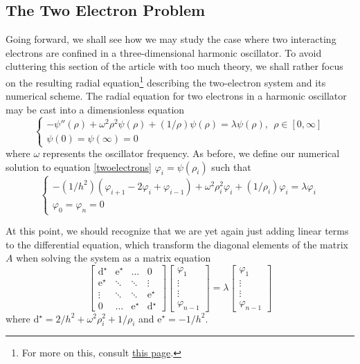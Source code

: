 	\subsection{The Two Electron Problem}
	Going forward, we shall see how we may study the case where two interacting electrons are confined in a three-dimensional harmonic oscillator. To avoid cluttering this section of the article with too much theory, we shall rather focus on the resulting radial equation\footnote{For more on this, consult \href{https://github.com/CompPhysics/ComputationalPhysics/blob/master/doc/Projects/2020/Project2/pdf/Project2.pdf}{this page}.} describing the two-electron system and its numerical scheme. The radial equation for two electrons in a harmonic oscillator may be cast into a dimensionless equation
	\begin{equation}
		\begin{cases}
		-\psi''(\rho) + \omega^2\rho^2\psi(\rho) + (1/\rho)\psi(\rho) = \lambda\psi(\rho), \ \ \rho \in [0,\infty]\\
		\psi(0) = \psi(\infty) = 0
		\end{cases}
		\label{twoelectrons}
	\end{equation}
	where $\omega$ represents the oscillator frequency. As before, we define our numerical solution to equation \eqref{twoelectrons} $\varphi_i = \psi(\rho_i)$ such that
	\begin{equation}
		\begin{cases}
		-(1/h^2)\left(\varphi_{i+1} - 2\varphi_i + \varphi_{i-1}\right) + \omega^2\rho^2_i\varphi_i + (1/\rho_i)\varphi_i = \lambda \varphi_i\\
		\varphi_0 = \varphi_n = 0
		\end{cases}
	\end{equation}
	
	
	At this point, we should recognize that we are yet again just adding linear terms to the differential equation, which transform the diagonal elements of the matrix $A$ when solving the system as a matrix equation
	\[
	\begin{bmatrix}
	\text{d$^\star$} & \text{e$^\star$} & \hdots & 0\\
	\text{e$^\star$} & \ddots & \ddots & \vdots \\
	\vdots & \ddots & \ddots & \text{e$^\star$} \\
	0 &\hdots & \text{e$^\star$} & \text{d$^\star$}
	\end{bmatrix}
	\begin{bmatrix}
	\varphi_1\\ \vdots \\ \vdots \\ \varphi_{n-1}
	\end{bmatrix}
	= 
	\lambda
	\begin{bmatrix}
	\varphi_1\\ \vdots \\ \vdots \\ \varphi_{n-1}
	\end{bmatrix}
	\]
	where d$^\star = 2/h^2 + \omega^2\rho^2_i + 1/\rho_i$ and e$^\star = -1/h^2$.
